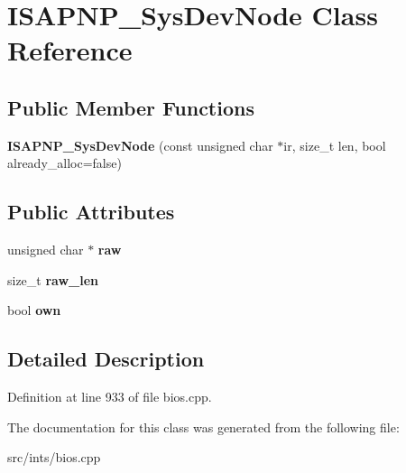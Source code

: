 \hypertarget{classISAPNP__SysDevNode}{\section{I\-S\-A\-P\-N\-P\-\_\-\-Sys\-Dev\-Node Class Reference}
\label{classISAPNP__SysDevNode}
}
\subsection*{Public Member Functions}
\begin{DoxyCompactItemize}
\item 
\hypertarget{classISAPNP__SysDevNode_a08b686d61113d6cd7a7783568515481f}{{\bfseries I\-S\-A\-P\-N\-P\-\_\-\-Sys\-Dev\-Node} (const unsigned char $\ast$ir, size\-\_\-t len, bool already\-\_\-alloc=false)}\label{classISAPNP__SysDevNode_a08b686d61113d6cd7a7783568515481f}

\end{DoxyCompactItemize}
\subsection*{Public Attributes}
\begin{DoxyCompactItemize}
\item 
\hypertarget{classISAPNP__SysDevNode_a88b23d674e4b48999a46d838dff47b7b}{unsigned char $\ast$ {\bfseries raw}}\label{classISAPNP__SysDevNode_a88b23d674e4b48999a46d838dff47b7b}

\item 
\hypertarget{classISAPNP__SysDevNode_a599de9be7c4895bfc76204eed3743fe4}{size\-\_\-t {\bfseries raw\-\_\-len}}\label{classISAPNP__SysDevNode_a599de9be7c4895bfc76204eed3743fe4}

\item 
\hypertarget{classISAPNP__SysDevNode_a0a342171b0ed0789f665868c14e9e6cc}{bool {\bfseries own}}\label{classISAPNP__SysDevNode_a0a342171b0ed0789f665868c14e9e6cc}

\end{DoxyCompactItemize}


\subsection{Detailed Description}


Definition at line 933 of file bios.\-cpp.



The documentation for this class was generated from the following file\-:\begin{DoxyCompactItemize}
\item 
src/ints/bios.\-cpp\end{DoxyCompactItemize}
